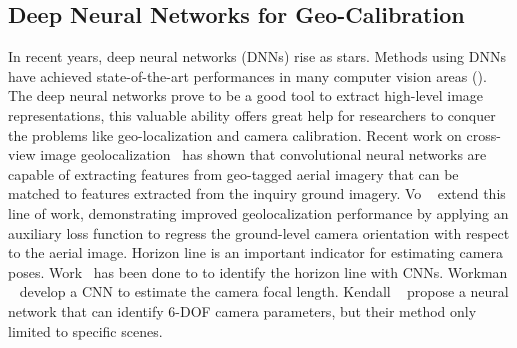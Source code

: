 \subsection{Deep Neural Networks for Geo-Calibration}
In recent years, deep neural networks (DNNs) rise as stars. Methods
using DNNs have achieved state-of-the-art performances in many computer
vision areas (). 
The deep neural networks prove to be a good tool to extract high-level
image representations, this valuable ability offers great help for researchers
to conquer the problems like geo-localization and camera calibration.
Recent work on cross-view image
geolocalization~\cite{lin2013cross,lin2015learning,workman2015geocnn,workman2015wide}
has shown that convolutional neural networks are capable of extracting
features from geo-tagged aerial imagery that can be matched to features extracted
from the inquiry ground imagery.  Vo \etal~\cite{vo2016localizing} extend this
line of work, demonstrating improved geolocalization performance by
applying an auxiliary loss function to regress the ground-level camera
orientation with respect to the aerial image.  Horizon line is an
important indicator for estimating camera poses.
Work~\cite{zhai2016horizon, workman2016horizon, hold2017perceptual}
has been done to to identify the horizon line with CNNs.
Workman \etal~\cite{workman2015deepfocal} develop a CNN to estimate
the camera focal length. Kendall \etal~\cite{kendall2015convolutional}
propose a neural network that can identify 6-DOF camera parameters,
but their method only limited to specific scenes.

